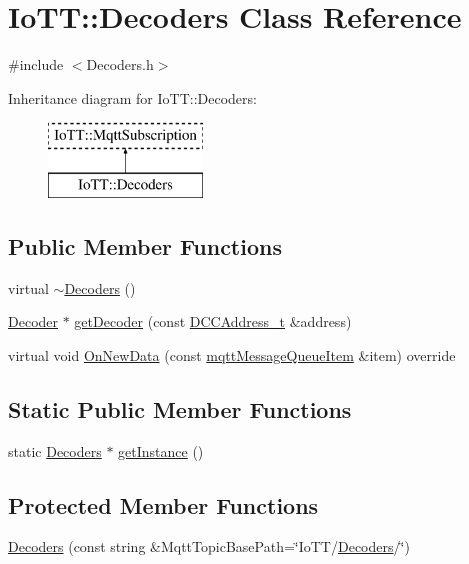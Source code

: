 \hypertarget{classIoTT_1_1Decoders}{}\section{Io\+TT\+:\+:Decoders Class Reference}
\label{classIoTT_1_1Decoders}


{\ttfamily \#include $<$Decoders.\+h$>$}

Inheritance diagram for Io\+TT\+:\+:Decoders\+:\begin{figure}[H]
\begin{center}
\leavevmode
\includegraphics[height=2.000000cm]{classIoTT_1_1Decoders}
\end{center}
\end{figure}
\subsection*{Public Member Functions}
\begin{DoxyCompactItemize}
\item 
virtual \hyperlink{classIoTT_1_1Decoders_a101b619ed4cfa0fb6ff19984e534161f}{$\sim$\+Decoders} ()
\item 
\hyperlink{classIoTT_1_1Decoder}{Decoder} $\ast$ \hyperlink{classIoTT_1_1Decoders_af079a0dd22459e170cd35a8740a21261}{get\+Decoder} (const \hyperlink{namespaceIoTT_a31b8cd9473fc447b3fb341b78afa54fe}{D\+C\+C\+Address\+\_\+t} \&address)
\item 
virtual void \hyperlink{classIoTT_1_1Decoders_aa413a310e8ba87b11d3a7c2b02a90dc4}{On\+New\+Data} (const \hyperlink{classIoTT_1_1mqttMessageQueueItem}{mqtt\+Message\+Queue\+Item} \&item) override
\end{DoxyCompactItemize}
\subsection*{Static Public Member Functions}
\begin{DoxyCompactItemize}
\item 
static \hyperlink{classIoTT_1_1Decoders}{Decoders} $\ast$ \hyperlink{classIoTT_1_1Decoders_a23583534ca36cafd911eebbbf9a0a299}{get\+Instance} ()
\end{DoxyCompactItemize}
\subsection*{Protected Member Functions}
\begin{DoxyCompactItemize}
\item 
\hyperlink{classIoTT_1_1Decoders_a2fe2db78da99d037611b348fe5e2d682}{Decoders} (const string \&Mqtt\+Topic\+Base\+Path=\char`\"{}Io\+TT/\hyperlink{classIoTT_1_1Decoders}{Decoders}/\char`\"{})
\end{DoxyCompactItemize}
